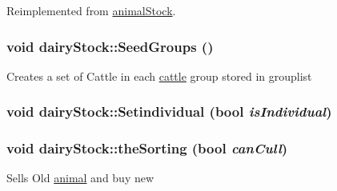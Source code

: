 Reimplemented from \hyperlink{classanimal_stock_a725a20b1ebac99314da9371c17aaad82}{animalStock}.\hypertarget{classdairy_stock_a4642b99f0f7e88a41d99071a915d3f8f}{
\subsubsection[{SeedGroups}]{\setlength{\rightskip}{0pt plus 5cm}void dairyStock::SeedGroups ()}}
\label{classdairy_stock_a4642b99f0f7e88a41d99071a915d3f8f}
Creates a set of Cattle in each \hyperlink{classcattle}{cattle} group stored in grouplist \hypertarget{classdairy_stock_a815b14e99987eef68185b0380086c1d2}{
\subsubsection[{Setindividual}]{\setlength{\rightskip}{0pt plus 5cm}void dairyStock::Setindividual (bool {\em isIndividual})}}
\label{classdairy_stock_a815b14e99987eef68185b0380086c1d2}
\hypertarget{classdairy_stock_a77965d4b6f503d4ef330214e814355ef}{
\subsubsection[{theSorting}]{\setlength{\rightskip}{0pt plus 5cm}void dairyStock::theSorting (bool {\em canCull})}}
\label{classdairy_stock_a77965d4b6f503d4ef330214e814355ef}
Sells Old \hyperlink{classanimal}{animal} and buy new 

